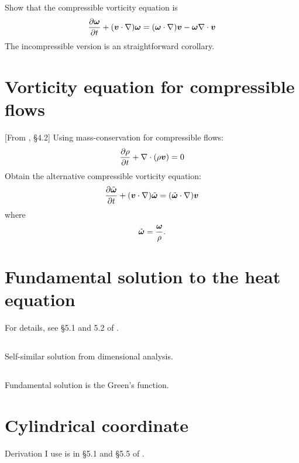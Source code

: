 \documentclass[11pt,letterpaper]{report}
\begin{document}
\subsection{}
Show that the compressible vorticity equation is
\begin{align}
    \frac{\partial\boldsymbol{\omega}}{\partial t}+(\boldsymbol{v}\cdot \nabla)\boldsymbol{\omega} = (\boldsymbol{\omega}\cdot \nabla)\boldsymbol{v}-\boldsymbol{\omega}\nabla\cdot\boldsymbol{v}
\end{align}
The incompressible version is an straightforward corollary. 

\section{Vorticity equation for compressible flows}
[From \cite{Vallis_17}, \S 4.2] Using mass-conservation for compressible flows:
\begin{align}
    \frac{\partial\rho}{\partial t}+\nabla\cdot(\rho\boldsymbol{v}) = 0
\end{align}
Obtain the alternative compressible vorticity equation:
\begin{align}
    \frac{\partial\tilde{\boldsymbol{\omega}}}{\partial t}+(\boldsymbol{v}\cdot \nabla)\tilde{\boldsymbol{\omega}} = (\tilde{\boldsymbol{\omega}}\cdot \nabla)\boldsymbol{v}
\end{align}
where
\begin{align}
    \tilde{\boldsymbol{\omega}} = \frac{\boldsymbol{\omega}}{\rho}.
\end{align}

\section{Fundamental solution to the heat equation}
For details, see \S 5.1 and 5.2 of \cite{ShearerLevy_15}.

\subsection{}
Self-similar solution from dimensional analysis. 

\subsection{}
Fundamental solution is the Green's function.

\section{Cylindrical coordinate}
Derivation I use is in \S5.1 and \S5.5 of \cite{Brannon_04}.
\end{document}
